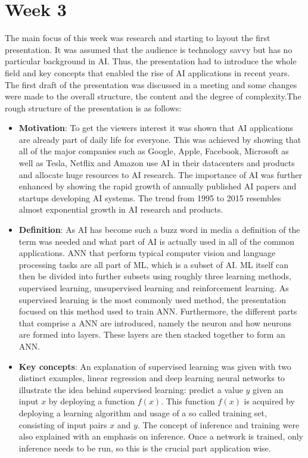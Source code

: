 \section{Week 3}
The main focus of this week was research and starting to layout the first presentation. It was assumed that the audience is technology savvy but has no particular background in \ac{AI}. Thus, the presentation had to introduce the whole field and key concepts that enabled the rise of \ac{AI} applications in recent years. The first draft of the presentation was discussed in a meeting and some changes were made to the overall structure, the content and the degree of complexity.The rough structure of the presentation is as follows:
\begin{itemize}
	\item \textbf{Motivation}: To get the viewers interest it was shown that \ac{AI} applications are already part of daily life for everyone. This was achieved by showing that all of the major companies such as Google, Apple, Facebook, Microsoft as well as Tesla, Netflix and Amazon use \ac{AI} in their datacenters and products and allocate huge resources to \ac{AI} research. The importance of \ac{AI} was further enhanced by showing the rapid growth of annually published \ac{AI} papers and startups developing \ac{AI} systems. The trend from 1995 to 2015 resembles almost exponential growth in \ac{AI} research and products.
	\item \textbf{Definition}: As \ac{AI} has become such a buzz word in media a definition of the term was needed and what part of \ac{AI} is actually used in all of the common applications. \ac{ANN} that perform typical computer vision and language processing tasks are all part of \ac{ML}, which is a subset of \ac{AI}. \ac{ML} itself can then be divided into further subsets using roughly three learning methods, supervised learning, unsupervised learning and reinforcement learning. As supervised learning is the most commonly used method, the presentation focused on this method used to train \ac{ANN}. Furthermore, the different parts that comprise a \ac{ANN} are introduced, namely the neuron and how neurons are formed into layers. These layers are then stacked together to form an \ac{ANN}.
	\item \textbf{Key concepts}: An explanation of supervised learning was given with two distinct examples, linear regression and deep learning neural networks to illustrate the idea behind supervised learning: predict a value $y$ given an input $x$ by deploying a function $f(x)$. This function $f(x)$ is acquired by deploying a learning algorithm and usage of a so called training set, consisting of input pairs $x$ and $y$. The concept of inference and training were also explained with an emphasis on inference. Once a network is trained, only inference needs to be run, so this is the crucial part application wise.

\end{itemize}
